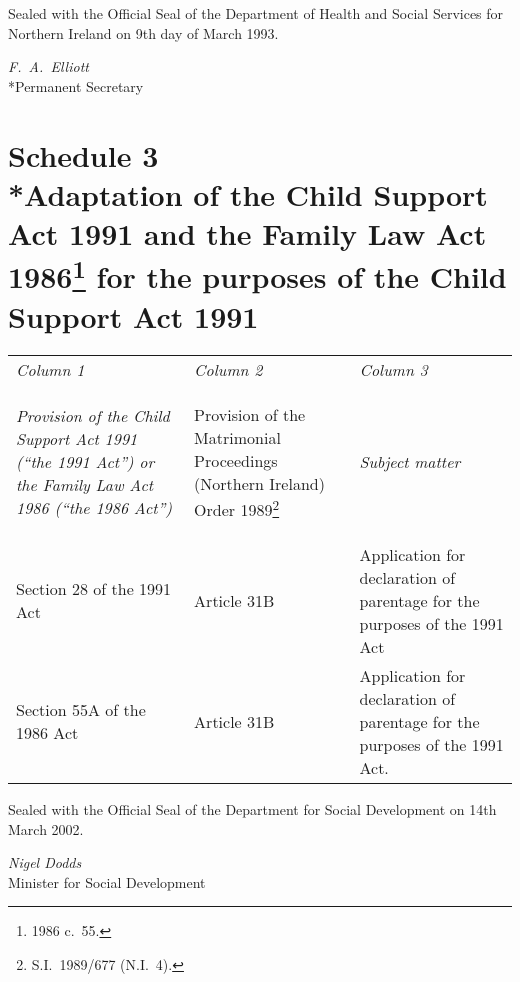 \documentclass[12pt,a4paper]{article}
\begin{document}
Sealed with the Official Seal of the Department of Health and Social Services for Northern Ireland on 9th day of March 1993.


{\raggedleft
\emph{F.\ A.\ Elliott}\\*Permanent Secretary

}

\part[Schedule 3 --- Adaptation of the Child Support Act 1991 and the Family Law Act 1986 for the purposes of the Child Support Act 1991]{Schedule 3\\*Adaptation of the Child Support Act 1991 and the Family Law Act 1986\footnote{1986 c.\ 55.} for the purposes of the Child Support Act 1991}


\medskip

\noindent
{\footnotesize
\begin{longtable}{p{142.207pt}p{100.4398pt}p{111.34279pt}}
\hline
\itshape Column 1	& \itshape Column 2	& \itshape Column 3\\
\itshape Provision of the Child Support Act 1991 (“the 1991 Act”) or the Family Law Act 1986 (“the 1986 Act”)	& \itshape\raggedright Provision of the Matrimonial Proceedings (Northern Ireland) Order 1989\footnote{S.I.\ 1989/677 (N.I.\ 4).}	& \itshape Subject matter\\
\hline
\endhead
\hline
\endlastfoot
Section 28 of the 1991 Act	&Article 31B	&Application for declaration of parentage for the purposes of the 1991 Act\\
Section 55A of the 1986 Act	&Article 31B	&Application for declaration of parentage for the purposes of the 1991 Act.\\
\end{longtable}

}


\bigskip

Sealed with the Official Seal of the Department for Social Development on 14th March 2002.

{\raggedleft
\emph{Nigel Dodds}\\
Minister for Social Development

}
\end{document}
